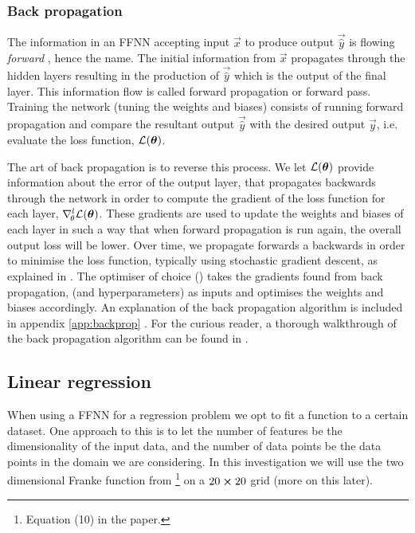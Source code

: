     





    \subsubsection{Back propagation}\label{sec:back_propagation}


    The information in an FFNN accepting input $\vec{x}$ to produce output $\vec{\hat{y}}$ is flowing \textit{forward} \citep{Goodfellow2016}, hence the name. The initial information from $\vec{x}$ propagates through the hidden layers resulting in the production of $\vec{\hat{y}}$ which is the output of the final layer. This information flow is called forward propagation or forward pass. Training the network (tuning the weights and biases) consists  of running forward propagation and compare the resultant output $\vec{\hat{y}}$ with the desired output $\vec{y}$, i.e. evaluate the loss function, $\mathcal{L}(\boldsymbol{\theta})$. 
    

    The art of back propagation is to reverse this process. We let $\mathcal{L}(\boldsymbol{\theta})$ provide information about the error of the output layer, that propagates backwards through the network in order to compute the gradient of the loss function for each layer, $\nabla^l_{\!\theta}\mathcal{L}(\boldsymbol{\theta})$. These gradients are used to update the weights and biases of each layer in such a way that when forward propagation is run again, the overall output loss will be lower. Over time, we propagate forwards a backwards in order to minimise the loss function, typically using stochastic gradient descent, as explained in . The optimiser of choice () takes the gradients found from back propagation, (and hyperparameters) as inputs and optimises the weights and biases accordingly. An explanation of the back propagation algorithm is included in appendix \ref{app:backprop} \citep{Goodfellow2016,mhjensen}. For the curious reader, a thorough walkthrough of the back propagation algorithm can be found in \citep[chapter 6.5]{Goodfellow2016}.

\subsection{Linear regression}\label{sec:regression}
    When using a FFNN for a regression problem we opt to fit a function to a certain dataset. One approach to this is to let the number of features be the dimensionality of the input data, and the number of data points be the data points in the domain we are considering. In this investigation we will use the two dimensional Franke function from \projectOne\footnote{Equation (10) in the paper.} on a $20\cross 20$ grid (more on this later).
    

